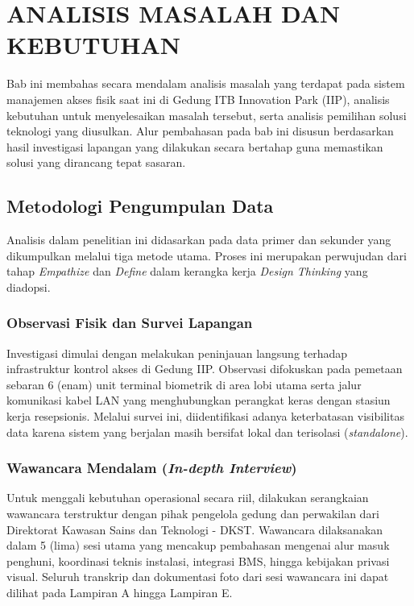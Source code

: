 \cleardoublepage
\chapter{ANALISIS MASALAH DAN KEBUTUHAN}
\label{chap:analisis}
Bab ini membahas secara mendalam analisis masalah yang terdapat pada sistem manajemen akses fisik saat ini di Gedung ITB Innovation Park (IIP), analisis kebutuhan untuk menyelesaikan masalah tersebut, serta analisis pemilihan solusi teknologi yang diusulkan. Alur pembahasan pada bab ini disusun berdasarkan hasil investigasi lapangan yang dilakukan secara bertahap guna memastikan solusi yang dirancang tepat sasaran.

\section{Metodologi Pengumpulan Data}
Analisis dalam penelitian ini didasarkan pada data primer dan sekunder yang dikumpulkan melalui tiga metode utama. Proses ini merupakan perwujudan dari tahap \textit{Empathize} dan \textit{Define} dalam kerangka kerja \textit{Design Thinking} yang diadopsi.

\subsection{Observasi Fisik dan Survei Lapangan}
Investigasi dimulai dengan melakukan peninjauan langsung terhadap infrastruktur kontrol akses di Gedung IIP. Observasi difokuskan pada pemetaan sebaran 6 (enam) unit terminal biometrik di area lobi utama serta jalur komunikasi kabel LAN yang menghubungkan perangkat keras dengan stasiun kerja resepsionis. Melalui survei ini, diidentifikasi adanya keterbatasan visibilitas data karena sistem yang berjalan masih bersifat lokal dan terisolasi (\textit{standalone}).

\subsection{Wawancara Mendalam (\textit{In-depth Interview})}
Untuk menggali kebutuhan operasional secara riil, dilakukan serangkaian wawancara terstruktur dengan pihak pengelola gedung dan perwakilan dari Direktorat Kawasan Sains dan Teknologi - DKST. Wawancara dilaksanakan dalam 5 (lima) sesi utama yang mencakup pembahasan mengenai alur masuk penghuni, koordinasi teknis instalasi, integrasi BMS, hingga kebijakan privasi visual. Seluruh transkrip dan dokumentasi foto dari sesi wawancara ini dapat dilihat pada Lampiran A hingga Lampiran E.

